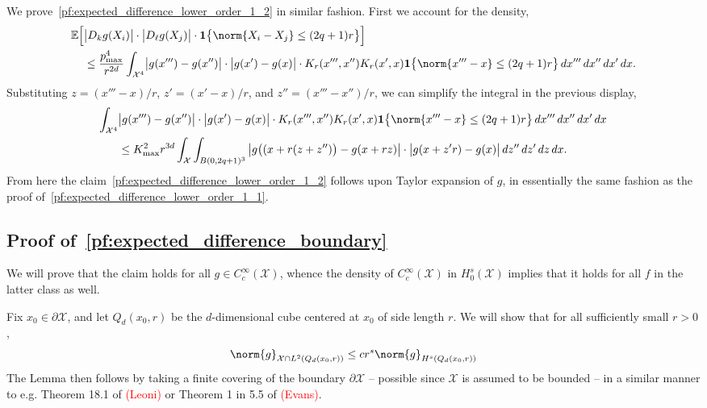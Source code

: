\documentclass{article}
\newcommand{\1}{\mathbf{1}}
\newcommand{\Xset}{\mathcal{X}}
\newcommand{\Leb}{L}
\newcommand{\Ebb}{\mathbb{E}}
\theoremstyle{alden}
\theoremstyle{aldenthm}
\theoremstyle{definition}
\theoremstyle{remark}
\begin{document}
We prove~\eqref{pf:expected_difference_lower_order_1_2} in similar fashion. First we account for the density,
\begin{align*}
\Ebb\Bigl[& \bigl|D_{k}g(X_i)\bigr|\cdot \bigl|D_{\ell}g(X_j)\bigr| \cdot\1\bigl\{\norm{X_i - X_j} \leq (2q + 1)r\bigr\}\Bigr] \\
& \leq \frac{p_{\max}^4}{r^{2d}} \int_{\Xset^4} \bigl|g(x''') - g(x'')\bigr| \cdot \bigl|g(x') - g(x)\bigr| \cdot  K_r(x''',x'') K_r(x',x) \1\bigl\{\norm{x''' - x} \leq (2q + 1)r\bigr\} \,dx''' \,dx'' \,dx' \,dx.
\end{align*}
Substituting $z = (x''' - x)/r$, $z' = (x' - x)/r$, and $z'' = (x''' - x'')/r$, we can simplify the integral in the previous display,
\begin{align*}
\int_{\Xset^4} & \bigl|g(x''') - g(x'')\bigr| \cdot \bigl|g(x') - g(x)\bigr| \cdot  K_r(x''',x'') K_r(x',x) \1\bigl\{\norm{x''' - x} \leq (2q + 1)r\bigr\} \,dx''' \,dx'' \,dx' \,dx \\
& \leq K_{\max}^2 r^{3d} \int_{\Xset} \int_{B(0,2q + 1)^3} \big|g\bigl((x + r(z + z'')\bigr) - g(x + rz)\bigr| \cdot \bigl|g(x + z'r) - g(x)\bigr| \,dz'' \,dz' \,dz \,dx.
\end{align*}
From here the claim~\eqref{pf:expected_difference_lower_order_1_2} follows upon Taylor expansion of $g$, in essentially the same fashion as the proof of~\eqref{pf:expected_difference_lower_order_1_1}.

\subsection{Proof of~\eqref{pf:expected_difference_boundary}}
\label{subsec:proof_sobolev_norm_boundary}
We will prove that the claim holds for all $g \in C_c^{\infty}(\Xset)$, whence the density of $C_c^{\infty}(\Xset)$ in $H_0^s(\Xset)$ implies that it holds for all $f$ in the latter class as well.

Fix $x_0 \in \partial \Xset$, and let $Q_d(x_0,r)$ be the $d$-dimensional cube centered at $x_0$ of side length $r$. We will show that for all sufficiently small $r > 0$,
\begin{equation}
\norm{g}_{\Xset \cap \Leb^2(Q_d(x_0,r))} \leq c r^s \norm{g}_{H^s(Q_d(x_0,r))}
\end{equation}
The Lemma then follows by taking a finite covering of the boundary $\partial \Xset$ -- possible since $\Xset$ is assumed to be bounded -- in a similar manner to e.g. Theorem 18.1 of \textcolor{red}{(Leoni)} or Theorem 1 in 5.5 of \textcolor{red}{(Evans)}.
\end{document}
